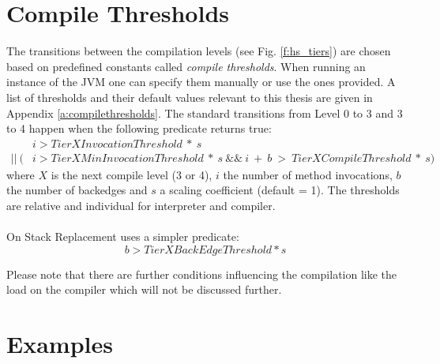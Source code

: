 \section{Compile Thresholds}
\label{s:compilethresholds}
The transitions between the compilation levels (see Fig. \ref{f:hs_tiers}) are chosen based on predefined constants called \textit{compile thresholds}. When running an instance of the JVM one can specify them manually or use the ones provided. A list of thresholds and their default values relevant to this thesis are given in Appendix \ref{a:compilethresholds}.
The standard transitions from Level 0 to 3 and 3 to 4 happen when the following predicate returns true:
\begin{align*}
& i > TierXInvocationThreshold \ * \ s \\
 || \ (&i > TierXMinInvocationThreshold \ * \ s \ \&\& \ i \ + \ b \ > \ TierXCompileThreshold \ * \ s) 
\end{align*}
where $X$ is the next compile level (3 or 4), $i$ the number of method invocations, $b$ the number of backedges and $s$ a scaling coefficient (default = 1).
The thresholds are relative and individual for interpreter and compiler.
\\\\
On Stack Replacement uses a simpler predicate:
$$b > TierXBackEdgeThreshold * s$$

Please note that there are further conditions influencing the compilation like the load on the compiler which will not be discussed further.

\section{Examples}

